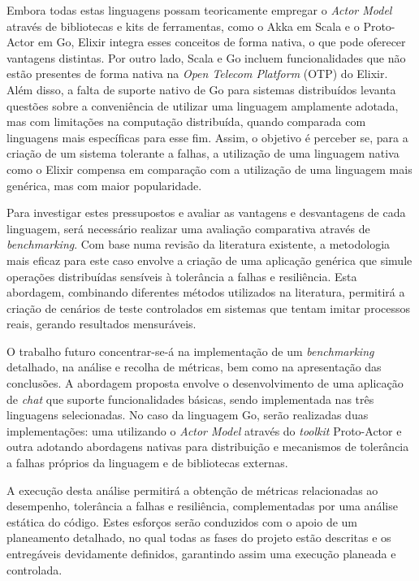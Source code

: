 \begin{abstractotherlanguage}
Embora todas estas linguagens possam teoricamente empregar o \textit{Actor Model} através de bibliotecas e kits de ferramentas, como o Akka em Scala e o Proto-Actor em Go, Elixir integra esses conceitos de forma nativa, o que pode oferecer vantagens distintas. Por outro lado, Scala e Go incluem funcionalidades que não estão presentes de forma nativa na \textit{Open Telecom Platform} (OTP) do Elixir. Além disso, a falta de suporte nativo de Go para sistemas distribuídos levanta questões sobre a conveniência de utilizar uma linguagem amplamente adotada, mas com limitações na computação distribuída, quando comparada com linguagens mais específicas para esse fim. Assim, o objetivo é perceber se, para a criação de um sistema tolerante a falhas, a utilização de uma linguagem nativa como o Elixir compensa em comparação com a utilização de uma linguagem mais genérica, mas com maior popularidade.

Para investigar estes pressupostos e avaliar as vantagens e desvantagens de cada linguagem, será necessário realizar uma avaliação comparativa através de \textit{benchmarking}. Com base numa revisão da literatura existente, a metodologia mais eficaz para este caso envolve a criação de uma aplicação genérica que simule operações distribuídas sensíveis à tolerância a falhas e resiliência. Esta abordagem, combinando diferentes métodos utilizados na literatura, permitirá a criação de cenários de teste controlados em sistemas que tentam imitar processos reais, gerando resultados mensuráveis.

O trabalho futuro concentrar-se-á na implementação de um \textit{benchmarking} detalhado, na análise e recolha de métricas, bem como na apresentação das conclusões. A abordagem proposta envolve o desenvolvimento de uma aplicação de \textit{chat} que suporte funcionalidades básicas, sendo implementada nas três linguagens selecionadas. No caso da linguagem Go, serão realizadas duas implementações: uma utilizando o \textit{Actor Model} através do \textit{toolkit} Proto-Actor e outra adotando abordagens nativas para distribuição e mecanismos de tolerância a falhas próprios da linguagem e de bibliotecas externas.

A execução desta análise permitirá a obtenção de métricas relacionadas ao desempenho, tolerância a falhas e resiliência, complementadas por uma análise estática do código. Estes esforços serão conduzidos com o apoio de um planeamento detalhado, no qual todas as fases do projeto estão descritas e os entregáveis devidamente definidos, garantindo assim uma execução planeada e controlada.

\end{abstractotherlanguage}

